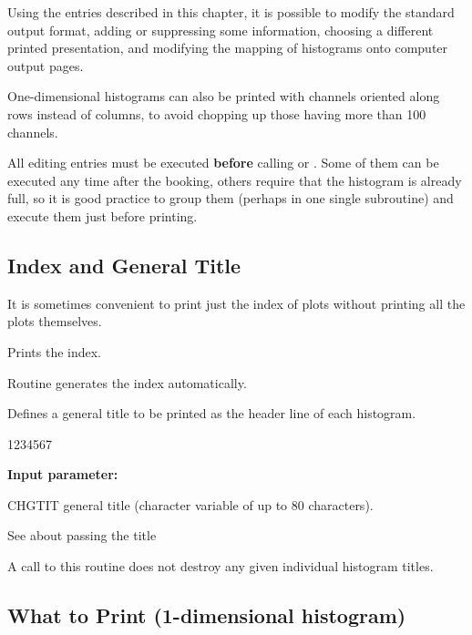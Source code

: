Using the entries described in this chapter, it is possible to modify
the standard output format, adding or suppressing some information,
choosing a different printed presentation, and modifying the mapping
of histograms onto computer output pages.
 
One-dimensional histograms can also be printed with channels oriented
along rows instead of columns, to avoid chopping up those having
more than 100 channels.
 
All editing entries must be executed
{\bf before} calling  or .
Some of them can be executed any time after
the booking, others require that the histogram is already full, so
it is good practice to group them
(perhaps in one single subroutine) and execute them
just before printing.
 
\subsection{Index and General Title}
\label{HINGENTI}
 
It is sometimes convenient to print just the index of plots without
printing all the plots themselves.
 
 
\Action Prints the index.
 
\Remark
Routine  generates the index automatically.
 
 
\Action Defines
a general title to be printed as the header line of each histogram.
 
\begin{DLttc}{1234567}
\item[{\rm\bf Input parameter:}]
\item[CHGTIT] general title (character variable of up to 80 characters).
\end{DLttc}
 
\Remark
 
\begin{UL}
\item See  about passing the title
\item A call to this routine
does not destroy any given individual histogram titles.
\end{UL}
 
\subsection{What to Print (1-dimensional histogram)}
\label{HWHATPRI}
 

